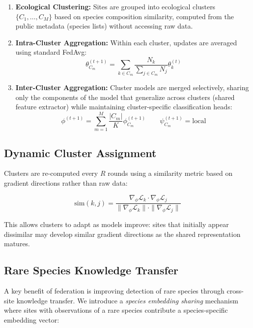 \begin{enumerate}[leftmargin=*]
    \item \textbf{Ecological Clustering:} Sites are grouped into ecological clusters $\{C_1, \ldots, C_M\}$ based on species composition similarity, computed from the public metadata (species lists) without accessing raw data.
    \item \textbf{Intra-Cluster Aggregation:} Within each cluster, updates are averaged using standard FedAvg:
    \begin{equation}
        \theta_{C_m}^{(t+1)} = \sum_{k \in C_m} \frac{N_k}{\sum_{j \in C_m} N_j} \theta_k^{(t)}
    \end{equation}
    \item \textbf{Inter-Cluster Aggregation:} Cluster models are merged selectively, sharing only the components of the model that generalize across clusters (shared feature extractor) while maintaining cluster-specific classification heads:
    \begin{equation}
        \phi^{(t+1)} = \sum_{m=1}^{M} \frac{|C_m|}{K} \phi_{C_m}^{(t+1)} \qquad \psi_{C_m}^{(t+1)} = \text{local}
    \end{equation}
\end{enumerate}

\subsection{Dynamic Cluster Assignment}

Clusters are re-computed every $R$ rounds using a similarity metric based on gradient directions rather than raw data:

\begin{equation}
    \text{sim}(k, j) = \frac{\nabla_\phi \mathcal{L}_k \cdot \nabla_\phi \mathcal{L}_j}{\|\nabla_\phi \mathcal{L}_k\| \cdot \|\nabla_\phi \mathcal{L}_j\|}
\end{equation}

This allows clusters to adapt as models improve: sites that initially appear dissimilar may develop similar gradient directions as the shared representation matures.

\subsection{Rare Species Knowledge Transfer}

A key benefit of federation is improving detection of rare species through cross-site knowledge transfer.
We introduce a \emph{species embedding sharing} mechanism where sites with observations of a rare species contribute a species-specific embedding vector:

